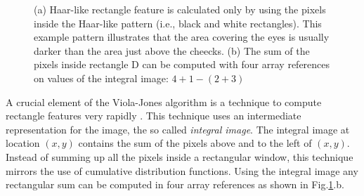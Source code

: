 \documentclass[conference]{IEEEtran}
\begin{document}
\begin{figure}[!htb]
\centering
{}
\caption{(a) Haar-like rectangle feature is calculated only by using the pixels inside the Haar-like pattern (i.e., black and white rectangles). This example pattern illustrates that the area covering the eyes is usually darker than the area just above the cheecks. (b) The sum of the pixels inside rectangle D can be computed with four array references on values of the integral image: $4+1-(2+3)$}
\label{fig_haar_example}
\end{figure}


A crucial element of the Viola-Jones algorithm is a technique to compute rectangle features very rapidly \cite{viola-2001,wang-2014}. This technique uses an intermediate representation for the image, the so called {\it integral image}. 
The integral image at location $(x,y)$ contains the sum of the pixels above and to the left of $(x,y)$.
Instead of summing up all the pixels inside a rectangular window, this technique mirrors the use of cumulative distribution functions.  Using the integral image any rectangular sum can be computed in four array references as shown in Fig.\ref{fig_haar_example}.b.
\end{document}
